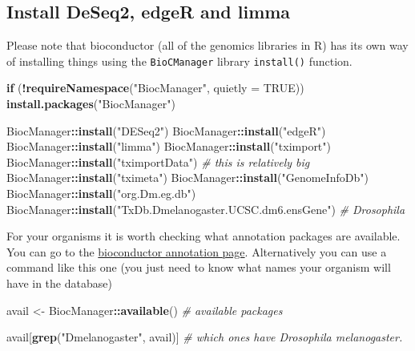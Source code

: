 \documentclass[
]{article}
\newenvironment{Shaded}{\begin{snugshade}}{\end{snugshade}}
\newcommand{\CommentTok}[1]{\textcolor[rgb]{0.56,0.35,0.01}{\textit{#1}}}
\newcommand{\ControlFlowTok}[1]{\textcolor[rgb]{0.13,0.29,0.53}{\textbf{#1}}}
\newcommand{\DataTypeTok}[1]{\textcolor[rgb]{0.13,0.29,0.53}{#1}}
\newcommand{\KeywordTok}[1]{\textcolor[rgb]{0.13,0.29,0.53}{\textbf{#1}}}
\newcommand{\NormalTok}[1]{#1}
\newcommand{\OperatorTok}[1]{\textcolor[rgb]{0.81,0.36,0.00}{\textbf{#1}}}
\newcommand{\OtherTok}[1]{\textcolor[rgb]{0.56,0.35,0.01}{#1}}
\newcommand{\StringTok}[1]{\textcolor[rgb]{0.31,0.60,0.02}{#1}}
\begin{document}
\hypertarget{install-deseq2-edger-and-limma}{%
\subsection{Install DeSeq2, edgeR and
limma}\label{install-deseq2-edger-and-limma}}

Please note that bioconductor (all of the genomics libraries in R) has
its own way of installing things using the \texttt{BioCManager} library
\texttt{install()} function.

\begin{Shaded}
\begin{Highlighting}[]
\ControlFlowTok{if}\NormalTok{ (}\OperatorTok{!}\KeywordTok{requireNamespace}\NormalTok{(}\StringTok{"BiocManager"}\NormalTok{, }\DataTypeTok{quietly =} \OtherTok{TRUE}\NormalTok{))}
    \KeywordTok{install.packages}\NormalTok{(}\StringTok{"BiocManager"}\NormalTok{)}

\NormalTok{BiocManager}\OperatorTok{::}\KeywordTok{install}\NormalTok{(}\StringTok{"DESeq2"}\NormalTok{)}
\NormalTok{BiocManager}\OperatorTok{::}\KeywordTok{install}\NormalTok{(}\StringTok{"edgeR"}\NormalTok{)}
\NormalTok{BiocManager}\OperatorTok{::}\KeywordTok{install}\NormalTok{(}\StringTok{"limma"}\NormalTok{)}
\NormalTok{BiocManager}\OperatorTok{::}\KeywordTok{install}\NormalTok{(}\StringTok{"tximport"}\NormalTok{)}
\NormalTok{BiocManager}\OperatorTok{::}\KeywordTok{install}\NormalTok{(}\StringTok{"tximportData"}\NormalTok{) }\CommentTok{# this is relatively big}
\NormalTok{BiocManager}\OperatorTok{::}\KeywordTok{install}\NormalTok{(}\StringTok{"tximeta"}\NormalTok{)}
\NormalTok{BiocManager}\OperatorTok{::}\KeywordTok{install}\NormalTok{(}\StringTok{"GenomeInfoDb"}\NormalTok{)}
\NormalTok{BiocManager}\OperatorTok{::}\KeywordTok{install}\NormalTok{(}\StringTok{"org.Dm.eg.db"}\NormalTok{)}
\NormalTok{BiocManager}\OperatorTok{::}\KeywordTok{install}\NormalTok{(}\StringTok{"TxDb.Dmelanogaster.UCSC.dm6.ensGene"}\NormalTok{) }\CommentTok{# Drosophila}
\end{Highlighting}
\end{Shaded}

For your organisms it is worth checking what annotation packages are
available. You can go to the
\href{https://bioconductor.org/packages/3.12/data/annotation/}{bioconductor
annotation page}. Alternatively you can use a command like this one (you
just need to know what names your organism will have in the database)

\begin{Shaded}
\begin{Highlighting}[]
\NormalTok{avail <-}\StringTok{ }\NormalTok{BiocManager}\OperatorTok{::}\KeywordTok{available}\NormalTok{() }\CommentTok{# available packages}

\NormalTok{avail[}\KeywordTok{grep}\NormalTok{(}\StringTok{"Dmelanogaster"}\NormalTok{, avail)] }\CommentTok{# which ones have Drosophila melanogaster.}
\end{Highlighting}
\end{Shaded}
\end{document}
